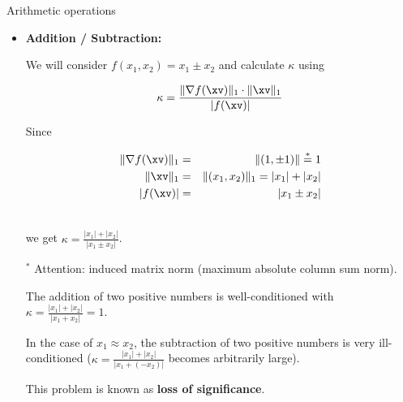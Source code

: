 \begin{vbframe}{Arithmetic operations}
\begin{itemize}
\item \textbf{Addition / Subtraction: }

We will consider $f(x_1, x_2) = x_1 \pm x_2$ and calculate $\kappa$ using

$$
\kappa = \frac{\|\nabla f(\xv)\|_1 \cdot \|\xv\|_1}{|f(\xv)|}
$$

Since

\vspace*{-.5cm}

\begin{eqnarray*}
\|\nabla f(\xv)\|_1 &=& \|(1, \pm 1) \|\overset{*}{=} 1 \\\
\|\xv\|_1 &=& \|(x_1, x_2)\|_1 = |x_1| + |x_2| \\\
|f(\xv)| &=& |x_1 \pm x_2|\\\
\end{eqnarray*}

\vspace*{-.5cm}

we get $\kappa = \frac{|x_1| + |x_2|}{|x_1 \pm x_2|}$.

\lz

\begin{footnotesize}
$^*$ Attention: induced matrix norm (maximum absolute column sum norm).
\end{footnotesize}

\framebreak

The addition of two positive numbers is well-conditioned with $\kappa = \frac{|x_1| + |x_2|}{|x_1 + x_2|} = 1$.

\lz

In the case of $x_1 \approx x_2$, the subtraction of two positive numbers is very ill-conditioned  ($\kappa = \frac{|x_1| + |x_2|}{|x_1 + (- x_2)|}$ becomes arbitrarily large).
\lz

This problem is known as \textbf{loss of significance}.

\end{itemize}

\end{vbframe}


